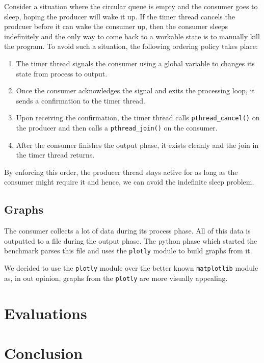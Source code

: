 \documentclass[10pt, author, twocolumn]{article}
\begin{document}
Consider a situation where the circular queue is empty and the consumer goes to sleep, hoping the producer will wake it up. If the timer thread cancels the prodcuer before it can wake the consumer up, then the consumer sleeps indefinitely and the only way to come back to a workable state is to manually kill the program. To avoid such a situation, the following ordering policy takes place:

\begin{enumerate}
    \item The timer thread signals the consumer using a global variable to changes its state from process to output. 
    \item Once the consumer acknowledges the signal and exits the processing loop, it sends a confirmation to the timer thread. 
    \item Upon receiving the confirmation, the timer thread calls \texttt{pthread\_cancel()} on the producer and then calls a \texttt{pthread\_join()} on the consumer.
    \item After the consumer finishes the output phase, it exists cleanly and the join in the timer thread returns. 
\end{enumerate}

By enforcing this order, the producer thread stays active for as long as the consumer might require it and hence, we can avoid the indefinite sleep problem. 

\subsection{Graphs}
The consumer collects a lot of data during its process phase. All of this data is outputted to a file during the output phase. The python phase which started the benchmark parses this file and uses the \texttt{plotly} module to build graphs from it.

We decided to use the \texttt{plotly} module over the better known \texttt{matplotlib} module as, in out opinion, graphs from the \texttt{plotly} are more visually appealing.

\section{Evaluations}

\section{Conclusion}



\end{document}
